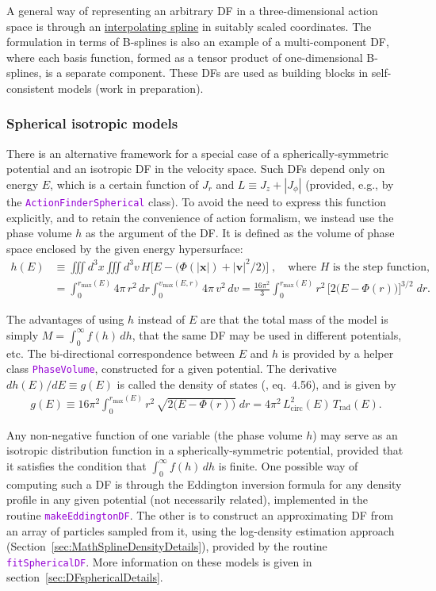 \documentclass[12pt]{article}
\newcommand{\ttt}[1]{\textcolor{darkviolet}{\texttt{#1}}}
\newcommand{\bv}{\boldsymbol{v}}
\newcommand{\bx}{\boldsymbol{x}}
\begin{document}
A general way of representing an arbitrary DF in a three-dimensional action space is through an  \hyperref[sec:SplineInterpolation]{interpolating spline} in suitably scaled coordinates. The formulation in terms of B-splines is also an example of a multi-component DF, where each basis function, formed as a tensor product of one-dimensional B-splines, is a separate component. These DFs are used as building blocks in self-consistent models (work in preparation).

\subsubsection{Spherical isotropic models}  \label{sec:DFspherical}

There is an alternative framework for a special case of a spherically-symmetric potential and an isotropic DF in the velocity space. Such DFs depend only on energy $E$, which is a certain function of $J_r$ and $L\equiv J_z+|J_\phi|$ (provided, e.g., by the \ttt{ActionFinderSpherical} class).
To avoid the need to express this function explicitly, and to retain the convenience of action formalism, we instead use the phase volume $h$ as the argument of the DF. It is defined as the volume of phase space enclosed by the given energy hypersurface:
\begin{align*}
h(E) &\equiv \iiint d^3x \iiint d^3v\, H\Big[E - \big(\Phi(|\bx|)+|\bv|^2/2\big)\Big] \;,\quad
\mbox{where $H$ is the step function,} \\
&= \int_0^{r_\mathrm{max}(E)} 4\pi\,r^2\,dr \int_0^{v_\mathrm{max}(E,r)} 4\pi\, v^2\,dv =
\frac{16\pi^2}{3} \int_0^{r_\mathrm{max}(E)} r^2\, \Big[2\big(E-\Phi(r)\big)\Big]^{3/2}\;dr.
\end{align*}

The advantages of using $h$ instead of $E$ are that the total mass of the model is simply $M=\int_0^\infty f(h)\,dh$, that the same DF may be used in different potentials, etc. The bi-directional correspondence between $E$ and $h$ is provided by a helper class \ttt{PhaseVolume}, constructed for a given potential. The derivative $dh(E)/dE \equiv g(E)$ is called the density of states (\cite{BinneyTremaine}, eq.~4.56), and is given by
\begin{align*}
g(E) \equiv 16\pi^2 \int_0^{r_\mathrm{max}(E)} r^2\, \sqrt{2\big(E-\Phi(r)\big)}\;dr 
= 4\pi^2\,L^2_\mathrm{circ}(E)\,T_\mathrm{rad}(E).
\end{align*}

Any non-negative function of one variable (the phase volume $h$) may serve as an isotropic distribution function in a spherically-symmetric potential, provided that it satisfies the condition that $\int_0^\infty f(h)\, dh$ is finite. 
One possible way of computing such a DF is through the Eddington inversion formula for any density profile in any given potential (not necessarily related), implemented in the routine \ttt{makeEddingtonDF}. The other is to construct an approximating DF from an array of particles sampled from it, using the log-density estimation approach (Section~\ref{sec:MathSplineDensityDetails}), provided by the routine \ttt{fitSphericalDF}.
More information on these models is given in section~\ref{sec:DFsphericalDetails}.
\end{document}

